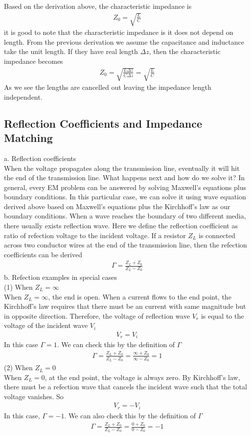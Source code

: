 \documentclass[a4paper]{article}
\begin{document}
Based on the derivation above, the characteristic impedance is 
\begin{align*}
	Z_0 = \sqrt{\frac{L}{C}}
\end{align*}
it is good to note that the characteristic impedance is it does not depend on length. From the previous derivation we assume the capacitance and inductance take the unit length. If they have real length  $\Delta z$, then the characteristic impedance becomes
\begin{align*}
	Z_0 = \sqrt{\frac{L \Delta z}{C \Delta z}} = \sqrt{\frac{L}{C}}
\end{align*}
As we see the lengths are cancelled out leaving the impedance length independent.
\subsection{Reflection Coefficients and Impedance Matching}
{a. Reflection coefficients}\\
When the voltage propagates along the transmission line, eventually it will hit the end of the transmission line. What happens next and how do we solve it? In general, every EM problem can be answered by solving Maxwell's equations plus boundary conditions. In this particular case, we can solve it using wave equation derived above based on Maxwell's equations plus the Kirchhoff's law as our boundary conditions. When a wave reaches the boundary of two different media, there usually exists reflection wave. Here we define the reflection coefficient as ratio of refection voltage to the incident voltage. If a resistor $Z_L$ is connected across two conductor wires at the end of the transmission line, then the refection coefficients can be derived
\begin{align*}
	\Gamma = \frac{Z_L + Z_0}{Z_L - Z_0}
\end{align*}
{b. Refection examples in special cases}\\
(1) When $Z_L = \infty$\\
When $Z_L = \infty$, the end is open. When a current flows to the end point, the Kirchhoff's law requires that there must be an current with same magnitude but in opposite direction. Therefore, the voltage of reflection wave $V_r$ is equal to the voltage of the incident wave $V_i$
\begin{align*}
	V_r = V_i
\end{align*}
In this case $\Gamma = 1$. We can check this by the definition of $\Gamma$
\begin{align*}
	\Gamma = \frac{Z_L + Z_0}{Z_L - Z_0} = \frac{\infty + Z_0}{\infty - Z_0} = 1
\end{align*}
(2) When $Z_L = 0$\\
When $Z_L = 0$, at the end point, the voltage is always zero. By Kirchhoff's law, there must be a refection wave that cancels the incident wave such that the total voltage vanishes. So\\
\begin{align*}
	V_r = - V_i
\end{align*}
In this case, $\Gamma = -1$. We can also check this by the definition of $\Gamma$
\begin{align*}
	\Gamma = \frac{Z_L + Z_0}{Z_L - Z_0} = \frac{0 + Z_0}{0 - Z_0} = -1
\end{align*}
\end{document}
